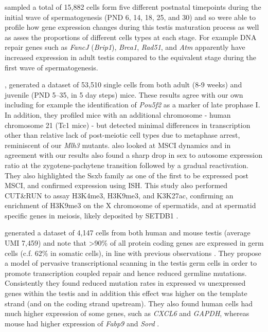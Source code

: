 \cite{Grive2019Dynamic} sampled a total of 15,882 cells form five different postnatal timepoints during the initial wave of spermatogenesis (PND 6, 14, 18, 25, and 30) and so were able to profile how gene expression changes during this testis maturation process as well as asses the proportions of different cells types at each stage.
For example DNA repair genes such as \textit{FancJ} (\textit{Brip1}), \textit{Brca1}, \textit{Rad51}, and \textit{Atm} apparently have increased expression in adult testis compared to the equivalent stage during the first wave of spermatogenesis.

\cite{Ernst2019Staged}, generated a dataset of 53,510 single cells from both adult (8-9 weeks) and juvenile (PND 5–35, in 5 day steps) mice.
These results agree with our own including for example the identification of \textit{Pou5f2} as a marker of late prophase I.
In addition, they profiled mice with an additional chromosome - human chromosome 21 (Tc1 mice) - but detected minimal differences in transcription other than relative lack of post-meiotic cell types due to metaphase arrest, reminiscent of our \textit{Mlh3} mutants.
\cite{Ernst2019Staged} also looked at MSCI dynamics and in agreement with our results also found a sharp drop in sex to autosome expression ratio at the zygotene-pachytene transition followed by a gradual reactivation.
They also highlighted the Ssxb family as one of the first to be expressed post MSCI, and confirmed expression using ISH.
This study also performed CUT\&RUN to assay H3K4me3, H3K9me3, and K3K27ac, confirming an enrichment of H3K9me3 on the X chromosome of spermatids, and at spermatid specific genes in meiosis, likely deposited by SETDB1 \parencite{Hirota2018SETDB1}.

\cite{Xia2019Widespread} generated a dataset of 4,147 cells from both human and mouse testis (average UMI 7,459) and note that >90\% of all protein coding genes are expressed in germ cells (c.f. 62\% in somatic cells), in line with previous observations \parencite{Soumillon2013Cellular, Schmidt1996Transcriptional}.
They propose a model of pervasive transcriptional scanning in the testis germ cells in order to promote transcription coupled repair and hence reduced germline mutations.
Consistently they found reduced mutation rates in expressed vs unexpressed genes within the testis and in addition this effect was higher on the template strand (and on the coding strand upstream).
They also found human cells had much higher expression of some genes, such as \textit{CXCL6} and \textit{GAPDH}, whereas mouse had higher expression of \textit{Fabp9} and \textit{Sord} \parencite{Xia2019Widespread}.

